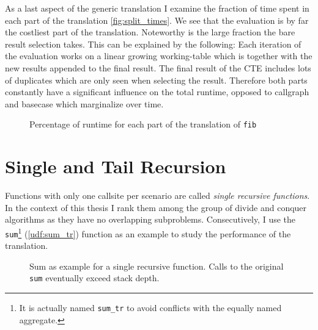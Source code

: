 As a last aspect of the generic translation I examine the fraction of time spent in each part of the translation \autoref{fig:split_times}. We see that the evaluation is by far the costliest part of the translation. Noteworthy is the large fraction the bare result selection takes. This can be explained by the following: Each iteration of the evaluation works on a linear growing working-table which is together with the new results appended to the final result. The final result of the CTE includes lots of duplicates which are only seen when selecting the result. Therefore both parts constantly have a significant influence on the total runtime, opposed to callgraph and basecase which marginalize over time.

\begin{figure}[h!]
    \centering\footnotesize
    
    \caption{Percentage of runtime for each part of the translation of \texttt{fib}}
    \label{fig:split_times}
\end{figure}


\iffalse
\begin{figure}[h]
    \centering\footnotesize
    
    \caption{Impact of the number of scenarios on the runtime. Single recursive function with expensive predicates}
    \label{fig:recn_times}
\end{figure}

Impact of number of scenarios (Overhead by predicates) \autoref{fig:recn_times}

\fi




\section{Single and Tail Recursion}

Functions with only one callsite per scenario are called \textit{single recursive functions}. In the context of this thesis I rank them among the group of divide and conquer algorithms as they have no overlapping subproblems. Consecutively, I use the \texttt{sum}\footnote{It is actually named \texttt{sum\_tr} to avoid conflicts with the equally named aggregate.} (\autoref{udf:sum_tr}) function as an example to study the performance of the translation.

\begin{figure}[h!]
    \centering\footnotesize
    
    \caption{Sum as example for a single recursive function. Calls to the original \texttt{sum} eventually exceed stack depth.}
    \label{fig:factorial_times}
\end{figure}

